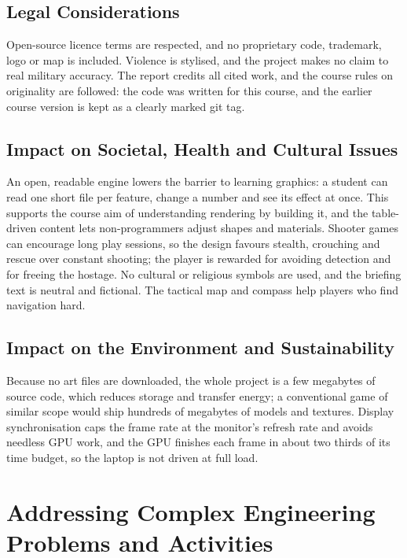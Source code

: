 \documentclass[12pt,a4paper,oneside]{report}
\begin{document}
\section{Legal Considerations}
Open-source licence terms are respected, and no proprietary code, trademark, logo or map is included. Violence is stylised, and the project makes no claim to real military accuracy. The report credits all cited work, and the course rules on originality are followed: the code was written for this course, and the earlier course version is kept as a clearly marked git tag.

\section{Impact on Societal, Health and Cultural Issues}
An open, readable engine lowers the barrier to learning graphics: a student can read one short file per feature, change a number and see its effect at once. This supports the course aim of understanding rendering by building it, and the table-driven content lets non-programmers adjust shapes and materials. Shooter games can encourage long play sessions, so the design favours stealth, crouching and rescue over constant shooting; the player is rewarded for avoiding detection and for freeing the hostage. No cultural or religious symbols are used, and the briefing text is neutral and fictional. The tactical map and compass help players who find navigation hard.

\section{Impact on the Environment and Sustainability}
Because no art files are downloaded, the whole project is a few megabytes of source code, which reduces storage and transfer energy; a conventional game of similar scope would ship hundreds of megabytes of models and textures. Display synchronisation caps the frame rate at the monitor's refresh rate and avoids needless GPU work, and the GPU finishes each frame in about two thirds of its time budget, so the laptop is not driven at full load.

\chapter{Addressing Complex Engineering Problems and Activities}
\end{document}
